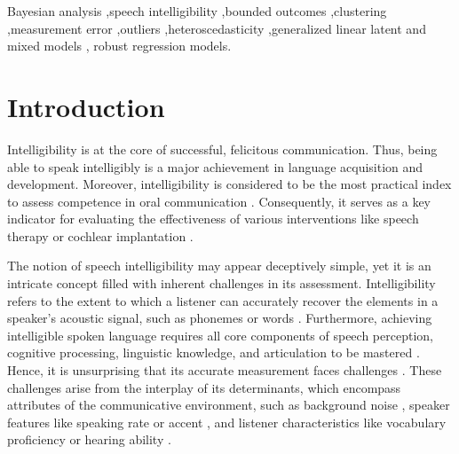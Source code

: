 \documentclass[
  authoryear,
  preprint,
  1p]{elsarticle}
\begin{document}
\begin{frontmatter}
\begin{keyword}
    Bayesian analysis \sep speech intelligibility \sep bounded
outcomes \sep clustering \sep measurement
error \sep outliers \sep heteroscedasticity \sep generalized linear
latent and mixed models \sep 
    robust regression models.
\end{keyword}
\end{frontmatter}
    
\section{Introduction}\label{sec-introduction}

Intelligibility is at the core of successful, felicitous communication.
Thus, being able to speak intelligibly is a major achievement in
language acquisition and development. Moreover, intelligibility is
considered to be the most practical index to assess competence in oral
communication \citep{Kent_et_al_1994}. Consequently, it serves as a key
indicator for evaluating the effectiveness of various interventions like
speech therapy or cochlear implantation \citep{Chin_et_al_2012}.

The notion of speech intelligibility may appear deceptively simple, yet
it is an intricate concept filled with inherent challenges in its
assessment. Intelligibility refers to the extent to which a listener can
accurately recover the elements in a speaker's acoustic signal, such as
phonemes or words
\citep{Freeman_et_al_2017, vanHeuven_2008, Whitehill_et_al_2004}.
Furthermore, achieving intelligible spoken language requires all core
components of speech perception, cognitive processing, linguistic
knowledge, and articulation to be mastered \citep{Freeman_et_al_2017}.
Hence, it is unsurprising that its accurate measurement faces challenges
\citep{Kent_et_al_1989}. These challenges arise from the interplay of
its determinants, which encompass attributes of the communicative
environment, such as background noise \citep{Munro_1998}, speaker
features like speaking rate \citep{Munro_et_al_1998} or accent
\citep{Jenkins_2000, Ockey_et_al_2016}, and listener characteristics
like vocabulary proficiency or hearing ability
\citep{Varonis_et_al_1985}.
\end{document}
